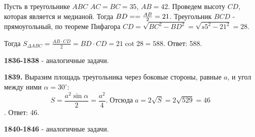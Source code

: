 Пусть в треугольнике $ABC$ $AC = BC = 35$, $AB = 42$. Проведем высоту $CD$, которая является и медианой. Тогда $BD = \linebreak =\frac{AB}{2} = 21$. Треугольник  $BCD$ - прямоугольный, по теореме Пифагора $CD = \sqrt{BC^2 - BD^2} = \sqrt{s5^2 - 21^2} = 28.$

Тогда $S_{\Delta ABC} = \frac{AB \cdot CD}{2} = BD \cdot CD = 21 \cot 28 = 588.$ \newline \null \hspace*{\fill} Ответ: 588.

\textbf{1836-1838} - аналогичные задачи.

\textbf{1839.}  Выразим площадь треугольника через боковые стороны, равные $a$, и угол между ними $\alpha = 30^\circ$:
\[
S = \frac{a^2 \sin{\alpha}}{2} = \frac{a^2}{4}.\; Отсюда \;a = 2\sqrt{S} = 2\sqrt{529} = 46
\]. \null \hspace*{\fill} Ответ: 46.

\textbf{1840-1846} - аналогичные задачи.